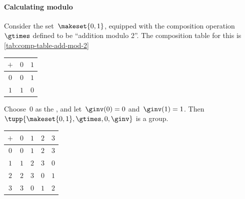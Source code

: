 
\paragraph{Calculating modulo}

\begin{example}
    \label{exa:grp-order-two}
    Consider the set~$\makeset{0, 1}$, equipped with the composition operation~$\gtimes$ defined to be ``addition modulo 2''.
    The composition table for this is \cref{tab:comp-table-add-mod-2}
    \begin{margintable}
        \caption{
            Addition modulo 2 on the set~$\makeset{0, 1}$.
        }
        \label{tab:comp-table-add-mod-2}
        \centering
        \begin{tabular}{c|cc}
            $+$ & $0$ & $1$ \\
            \hline
            $0$ & $0$ & $1$ \\
            $1$ & $1$ & $0$
        \end{tabular}
    \end{margintable}

    Choose~$0$ as the , and let~$\ginv(0) = 0$ and~$\ginv(1) = 1$.
    Then $\tupp{\makeset{0, 1}, \gtimes, 0, \ginv}$ is a group.
\end{example}


\begin{margintable}
    \caption{Cyclic group of order 4.}
    \label{tab:comp-table-Z4}
    \centering
    \begin{tabular}{c|cccc}
        $+$ & $0$ & $1$ & $2$ & $3$ \\
        \hline
        $0$ & $0$ & $1$ & $2$ & $3$ \\
        $1$ & $1$ & $2$ & $3$ & $0$ \\
        $2$ & $2$ & $3$ & $0$ & $1$ \\
        $3$ & $3$ & $0$ & $1$ & $2$
    \end{tabular}
\end{margintable}


